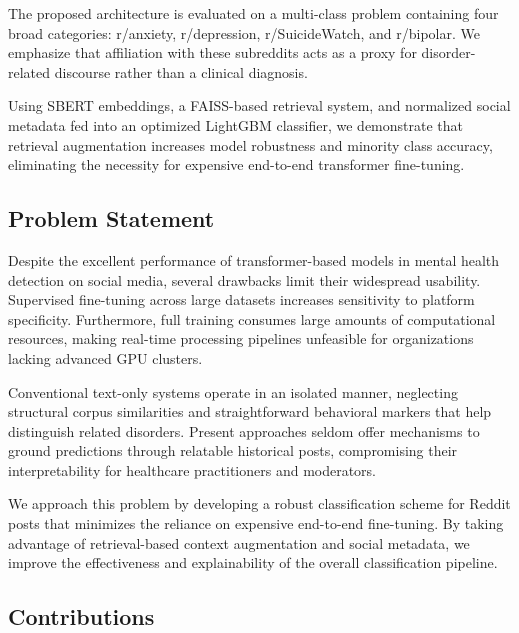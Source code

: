 \documentclass[11pt]{article}
\begin{document}
The proposed architecture is evaluated on a multi-class problem containing four broad categories: r/anxiety, r/depression, r/SuicideWatch, and r/bipolar. We emphasize that affiliation with these subreddits acts as a proxy for disorder-related discourse rather than a clinical diagnosis. 

Using SBERT embeddings, a FAISS-based retrieval system, and normalized social metadata fed into an optimized LightGBM classifier, we demonstrate that retrieval augmentation increases model robustness and minority class accuracy, eliminating the necessity for expensive end-to-end transformer fine-tuning.

\subsection{Problem Statement}

Despite the excellent performance of transformer-based models in mental health detection on social media, several drawbacks limit their widespread usability. Supervised fine-tuning across large datasets increases sensitivity to platform specificity. Furthermore, full training consumes large amounts of computational resources, making real-time processing pipelines unfeasible for organizations lacking advanced GPU clusters.

Conventional text-only systems operate in an isolated manner, neglecting structural corpus similarities and straightforward behavioral markers that help distinguish related disorders. Present approaches seldom offer mechanisms to ground predictions through relatable historical posts, compromising their interpretability for healthcare practitioners and moderators.

We approach this problem by developing a robust classification scheme for Reddit posts that minimizes the reliance on expensive end-to-end fine-tuning. By taking advantage of retrieval-based context augmentation and social metadata, we improve the effectiveness and explainability of the overall classification pipeline.

\subsection{Contributions}
\end{document}
